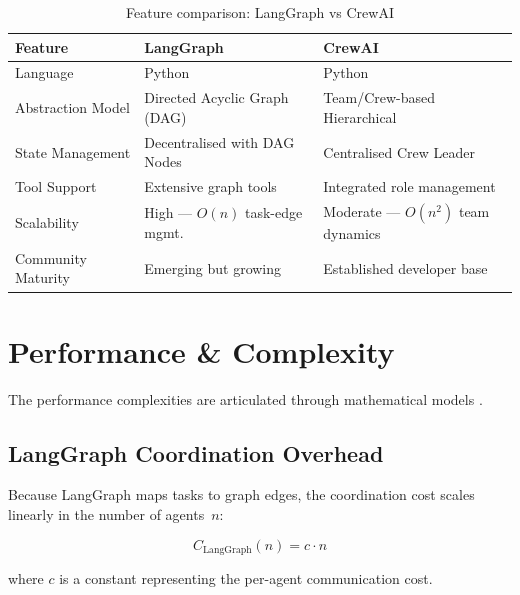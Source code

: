 \documentclass[12pt,a4paper]{article}
\begin{document}
\begin{table}[H]
    \centering
    \caption{Feature comparison: LangGraph vs CrewAI}
    \label{tab:comparison}
    \renewcommand{\arraystretch}{1.4}
    \begin{tabularx}{\textwidth}{l X X}
        \toprule
        \textbf{Feature} & \textbf{LangGraph} & \textbf{CrewAI} \\
        \midrule
        Language           & Python                          & Python                          \\
        Abstraction Model  & Directed Acyclic Graph (DAG)    & Team/Crew-based Hierarchical    \\
        State Management   & Decentralised with DAG Nodes    & Centralised Crew Leader         \\
        Tool Support       & Extensive graph tools           & Integrated role management      \\
        Scalability        & High — $O(n)$ task-edge mgmt.   & Moderate — $O(n^2)$ team dynamics \\
        Community Maturity & Emerging but growing            & Established developer base      \\
        \bottomrule
    \end{tabularx}
\end{table}

\section{Performance \& Complexity}
\label{sec:performance}

The performance complexities are articulated through mathematical models
\cite{Rogers2023Survey}.

\subsection{LangGraph Coordination Overhead}

Because LangGraph maps tasks to graph edges, the coordination cost scales
linearly in the number of agents~$n$:

\begin{equation}
    \label{eq:langgraph}
    C_{\text{LangGraph}}(n) = c \cdot n
\end{equation}

where $c$ is a constant representing the per-agent communication cost.
\end{document}
